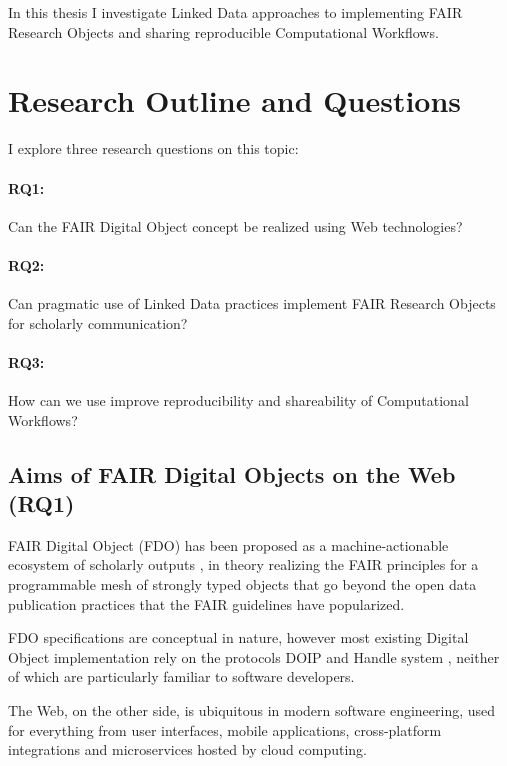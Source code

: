 In this thesis I investigate Linked Data approaches to implementing FAIR Research Objects and sharing reproducible Computational Workflows.

\section{Research Outline and Questions}

I explore three research questions on this topic:

\paragraph{RQ1:} Can the FAIR Digital Object concept be realized using Web technologies?

\paragraph{RQ2:} Can pragmatic use of Linked Data practices implement FAIR Research Objects for scholarly communication?

\paragraph{RQ3:} How can we use improve reproducibility and shareability of Computational Workflows?


\subsection{Aims of FAIR Digital Objects on the Web (RQ1)}

FAIR Digital Object (FDO) has been proposed as a machine-actionable ecosystem of scholarly outputs \cite{Schultes 2019}, in theory realizing the FAIR principles \cite{Wilkinson 2016} for a programmable mesh of strongly typed objects that go beyond the open data publication practices that the FAIR guidelines have popularized.

FDO specifications \cite{fdo-Overview} are conceptual in nature, however most existing Digital Object implementation \cite{Kahn 2006} rely on the protocols DOIP \cite{DigitalObjectInterface} and Handle system \cite{rfc3650}, neither of which are particularly familiar to software developers.

The Web, on the other side, is ubiquitous in modern software engineering, used for everything from user interfaces, mobile applications, cross-platform integrations and microservices hosted by cloud computing. 

